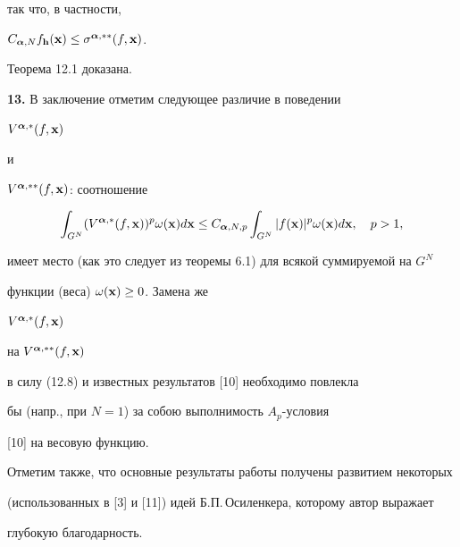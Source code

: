 так что, в частности,


$C_{{\boldsymbol {\alpha}},N}


f_{{\bold h}}({\bold x})\le \sigma^{{\boldsymbol {\alpha}},**}(f,{\bold x})$.


Теорема 12.1 доказана.


\medskip





\addtocounter{section}{1}


\setcounter{equation}{0}


\setcounter{lems}{0}


\setcounter{thms}{0}








{\bf 13.} В заключение отметим следующее различие в поведении


$V^{{\boldsymbol {\alpha}},*}(f,{\bold x})$


и


$V^{{\boldsymbol {\alpha}},**}(f,{\bold x})$: соотношение


$$


\int_{G^N}(V^{{\boldsymbol{\alpha}},*}(f,{\bold x}))^p\omega({\bold x})d{\bold x}\le


C_{{\boldsymbol{\alpha}},N,p}


\int_{G^N}|f({\bold x})|^p\omega({\bold x})d{\bold x},\quad p>1,


$$


имеет место (как это следует из теоремы 6.1) для всякой суммируемой на $G^N$


функции (веса) $\omega({\bold x})\ge 0$. Замена же


$V^{{\boldsymbol{\alpha}},*}(f,{\bold x})$


на $V^{{\boldsymbol{\alpha}},**}(f,{\bold x})$


в силу (12.8) и известных результатов [10] необходимо повлекла


бы (напр., при $N=1$) за собою выполнимость $A_p$-условия


[10] на весовую функцию. 





Отметим также, что основные результаты работы получены развитием некоторых


(использованных в [3] и [11]) идей Б.П.\,Осиленкера, которому автор выражает


глубокую благодарность.









